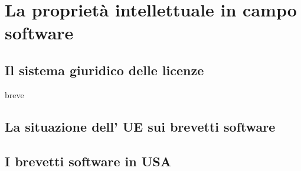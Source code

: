 \chapter{La proprietà intellettuale in campo software}


\section{Il sistema giuridico delle licenze}
breve
\section{La situazione dell' UE sui brevetti software}

\section{I brevetti software in USA}
